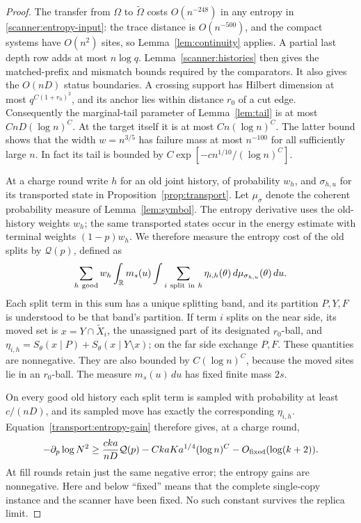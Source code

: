 \begin{proof}
The transfer from \(\Omega\) to \(\widetilde\Omega\) costs
\(O(n^{-248})\) in any entropy in \eqref{scanner:entropy-input}:
the trace distance is \(O(n^{-500})\), and the compact systems have
\(O(n^2)\) sites, so Lemma~\ref{lem:continuity} applies.  A partial
last depth row adds at most \(n\log q\).  Lemma~\ref{scanner:histories}
then gives the matched-prefix and mismatch bounds required by the
comparators.  It also gives the \(O(nD)\) status boundaries.  A
crossing support has Hilbert dimension at most \(q^{C(1+r_0)^2}\),
and its anchor lies within distance \(r_0\) of a cut edge.
Consequently the marginal-tail parameter of Lemma~\ref{lem:tail} is
at most \(CnD(\log n)^C\).  At the target itself it is at most
\(Cn(\log n)^C\).  The latter bound shows that the width \(w=n^{3/5}\)
has failure mass at most \(n^{-100}\) for all sufficiently large
\(n\).  In fact its tail is bounded by
\(C\exp[-c n^{1/10}/(\log n)^C]\).

At a charge round write \(h\) for an old joint history, of probability
\(w_h\), and \(\sigma_{h,u}\) for its transported state in
Proposition~\ref{prop:transport}.  Let \(\mu_\sigma\) denote the
coherent probability measure of Lemma~\ref{lem:symbol}.  The entropy
derivative uses the old-history weights \(w_h\); the same transported
states occur in the energy estimate with terminal weights \((1-p)w_h\).
We therefore measure the entropy cost of the old splits by
\(\mathcal Q(p)\), defined as
\begin{equation}
 \sum_{h\ {\mathrm{good}}}w_h
  \int_{\mathbb R}m_s(u)
   \int\sum_{i\ {\mathrm{split\ in}}\ h}
       \eta_{i,h}(\theta)\,d\mu_{\sigma_{h,u}}(\theta)\,du.
 \label{scanner:Q-definition}
\end{equation}
Each split term in this sum has a unique splitting band, and its
partition \(P,Y,F\) is understood to be that band's partition.
If term \(i\) splits on the near side, its moved set is
\(x=Y\cap\widetilde X_i\), the unassigned part of its designated
\(r_0\)-ball, and
\(\eta_{i,h}=S_\theta(x\mid P)+S_\theta(x\mid Y\setminus x)\);
on the far side exchange \(P,F\).  These quantities are nonnegative.
They are also bounded by \(C(\log n)^C\), because the moved sites lie
in an \(r_0\)-ball.  The measure \(m_s(u)\,du\) has fixed finite
mass \(2s\).

On every good old history each split term is sampled with probability
at least \(c/(nD)\), and its sampled move has exactly the corresponding
\(\eta_{i,h}\).  Equation~\eqref{transport:entropy-gain} therefore
gives, at a charge round,
\begin{equation}
 -\partial_p\log N^2
 \ge \frac{cka}{nD}\mathcal Q(p)
       -CkaK a^{1/4}(\log n)^C-O_{\rm fixed}(\log(k+2)).
 \label{scanner:charge-gain}
\end{equation}
At fill rounds retain just the same negative error; the entropy gains
are nonnegative.  Here and below ``fixed'' means that the complete
single-copy instance and the scanner have been fixed.  No such
constant survives the replica limit.


\end{proof}
